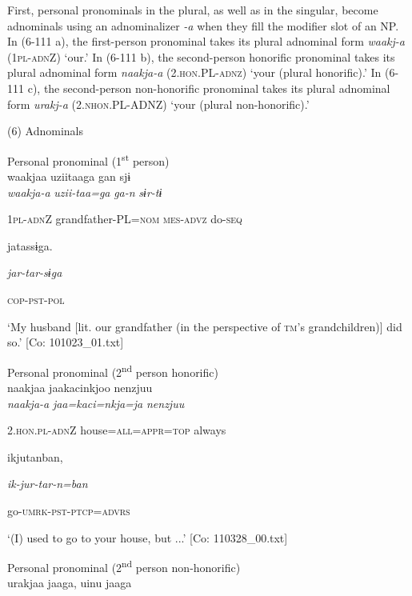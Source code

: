 First, personal pronominals in the plural, as well as in the singular, become adnominals using an adnominalizer \textit{{}-a} when they fill the modifier slot of an NP. In (6-111 a), the first-person pronominal takes its plural adnominal form \textit{waakj-a} (1\textsc{pl}-\textsc{adn}Z) ‘our.’ In (6-111 b), the second-person honorific pronominal takes its plural adnominal form \textit{naakja-a} (2.\textsc{hon}.PL-\textsc{adnz}) ‘your (plural honorific).’ In (6-111 c), the second-person non-honorific pronominal takes its plural adnominal form \textit{urakj-a} (2.\textsc{nhon}.PL-ADNZ) ‘your (plural non-honorific).’

(6)  Adnominals

 \ea Personal pronominal (1\textsuperscript{st} person)\\
{\TM}
\gll  waakjaa  uziitaaga  gan  sjɨ\\

      \textit{waakja-a}  \textit{uzii-taa=ga}  \textit{ga-n}  \textit{sɨr-tɨ}

      1\textsc{pl}-\textsc{adn}Z  grandfather-PL=\textsc{nom}  \textsc{mes}-\textsc{advz}  do-\textsc{seq}

      jatassɨga.

      \textit{jar-tar-sɨga}

      \textsc{cop}-\textsc{pst}-\textsc{pol}

\glt ‘My husband [lit. our grandfather (in the perspective of \textsc{tm}’s grandchildren)] did so.’ [Co: 101023\_01.txt]
\z

 \ex Personal pronominal (2\textsuperscript{nd} person honorific)\\
{\TM}
\gll  naakjaa  jaakacinkjoo  {\textbar}nenzjuu{\textbar}\\

      \textit{naakja-a}  \textit{jaa=kaci=nkja=ja}  \textit{nenzjuu}

      2.\textsc{hon}.\textsc{pl}-\textsc{adn}Z  house=\textsc{all}=\textsc{appr}=\textsc{top}  always

      ikjutanban,

      \textit{ik-jur-tar-n=ban}

      go-\textsc{umrk}-\textsc{pst}-\textsc{ptcp}=\textsc{advrs}

\glt ‘(I) used to go to your house, but ...’ [Co: 110328\_00.txt]
\z

 \ex Personal pronominal (2\textsuperscript{nd} person non-honorific)\\
{\TM}
\gll  urakjaa  jaaga,  uinu  jaaga\\

